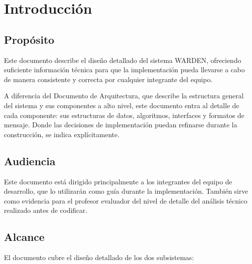 \documentclass[11pt,a4paper]{article}
\begin{document}

\begin{wardenrevisions}
\end{wardenrevisions}

\tableofcontents
\newpage

\section{Introducción}

\subsection{Propósito}
Este documento describe el diseño detallado del sistema WARDEN, ofreciendo
suficiente información técnica para que la implementación pueda llevarse a
cabo de manera consistente y correcta por cualquier integrante del equipo.

A diferencia del Documento de Arquitectura, que describe la estructura
general del sistema y sus componentes a alto nivel, este documento entra
al detalle de cada componente: sus estructuras de datos, algoritmos,
interfaces y formatos de mensaje. Donde las decisiones de implementación
puedan refinarse durante la construcción, se indica explícitamente.

\subsection{Audiencia}
Este documento está dirigido principalmente a los integrantes del equipo
de desarrollo, que lo utilizarán como guía durante la implementación.
También sirve como evidencia para el profesor evaluador del nivel de
detalle del análisis técnico realizado antes de codificar.

\subsection{Alcance}
El documento cubre el diseño detallado de los dos subsistemas:
\end{document}

